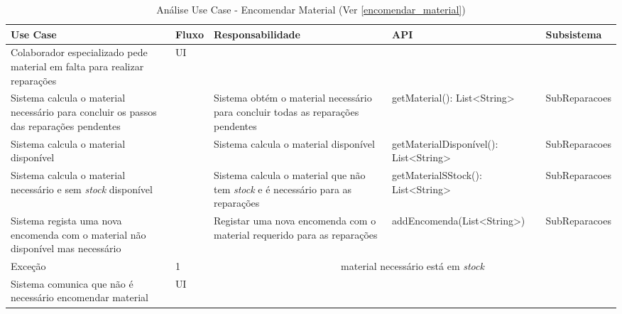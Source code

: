 \documentclass[../relatorio.tex]{subfiles}
\begin{document}
\begin{landscape}
    \begin{table}[!h]
        \centering
        \begin{tabular}{|p{5cm}|p{1cm}|p{4cm}|p{6cm}|p{3cm}|}
            \hline
            \rowcolor{gray!20!white}
            Use Case & Fluxo & Responsabilidade & API & Subsistema \\
            \hline
            \rowcolor{yellow}
            Colaborador especializado pede material em falta para realizar reparações
                     & UI
                     &
                     &
                     &
            \\
            \hline
            Sistema calcula o material necessário para concluir os passos das reparações pendentes
                     &
                     & Sistema obtém o material necessário para concluir todas as reparações pendentes
                     & getMaterial(): List<String>
                     & SubReparacoes
            \\
            \hline
            Sistema calcula o material disponível
                     &
                     & Sistema calcula o material disponível
                     & getMaterialDisponível(): List<String>
                     & SubReparacoes
            \\
            \hline
            Sistema calcula o material necessário e sem \textit{stock} disponível
                     &
                     & Sistema calcula o material que não tem \textit{stock} e é necessário para as reparações
                     & getMaterialSStock(): List<String>
                     & SubReparacoes
            \\
            \hline
            Sistema regista uma nova encomenda com o material não disponível mas necessário
                     &
                     & Registar uma nova encomenda com o material requerido para as reparações	
                     & addEncomenda(List<String>)
                     & SubReparacoes
            \\
            \hline
            \rowcolor{red!30}
            Exceção
                     & 
            1 
                     & 
            \multicolumn{3}{c}{material necessário está em \textit{stock}}
            \\
            \hline
            \rowcolor{yellow}
            Sistema comunica que não é necessário encomendar material
                    & UI
                    &
                    &
                    &
            \\
            \hline
        \end{tabular}
        \caption{Análise Use Case - Encomendar Material (Ver \ref{encomendar_material})}
    \end{table}
\end{landscape}
\end{document}

